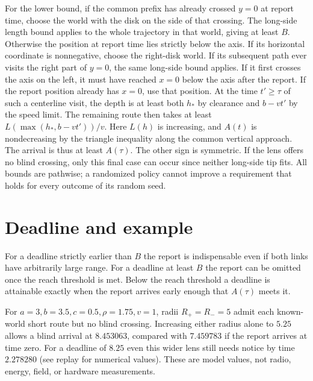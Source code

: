 \documentclass[11pt]{article}
\begin{document}
For the lower bound, if the common prefix has already crossed
\(y=0\) at report time, choose the world with the disk on the
side of that crossing. The long-side length bound applies to
the whole trajectory in that world, giving at least \(B\).
Otherwise the position at report time lies strictly below
the axis. If its horizontal coordinate is nonnegative,
choose the right-disk world. If its subsequent path ever
visits the right part of \(y=0\), the same long-side bound
applies. If it first crosses the axis on the left, it must
have reached \(x=0\) below the axis after the report.
If the report position already has \(x=0\), use that position.
At the time \(t'\ge\tau\) of such a centerline visit, the
depth is at least both \(h_*\) by clearance and \(b-vt'\)
by the speed limit. The remaining route then takes at
least \(L(\max(h_*,b-vt'))/v\). Here \(L(h)\) is increasing,
and \(A(t)\) is nondecreasing by the triangle inequality
along the common vertical approach. The arrival is thus
at least \(A(\tau)\). The other sign is symmetric. If the
lens offers no blind crossing, only this final case can
occur since neither long-side tip fits. All bounds are
pathwise; a randomized policy cannot improve a requirement
that holds for every outcome of its random seed.

\section{Deadline and example}
For a deadline strictly earlier than \(B\) the report is
indispensable even if both links have arbitrarily large
range. For a deadline at least \(B\) the report can be
omitted once the reach threshold is met. Below the reach
threshold a deadline is attainable exactly when the report
arrives early enough that \(A(\tau)\) meets it.

For \(a=3,b=3.5,c=0.5,\rho=1.75,v=1\), radii \(R_+=R_-=5\)
admit each known-world short route but no blind crossing.
Increasing either radius alone to \(5.25\) allows a blind
arrival at \(8.453063\), compared with \(7.459783\) if the
report arrives at time zero. For a deadline of \(8.25\)
even this wider lens still needs notice by time \(2.278280\)
(see replay for numerical values). These are model values,
not radio, energy, field, or hardware measurements.
\end{document}
